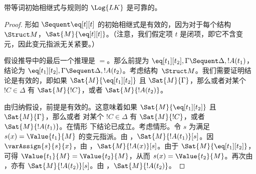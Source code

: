 \documentclass[../../../include/open-logic-section]{subfiles}
\begin{document}


\begin{prop}
带等词初始相继式与规则的 $\Log{LK}$ 是可靠的。
\end{prop}

\begin{proof}
形如 ${} \Sequent \eq[t][t]$ 的初始相继式是有效的，因为对于每个结构~$\Struct M$，$\Sat{M}{\eq[t][t]}$。（注意，我们假定项 $t$ 是闭项，即它不含变元，因此变元指派无关紧要。）

假设推导中的最后一个推理是 $=$。那么前提为 $\eq[t_1][t_2], \Gamma \Sequent \Delta, !A(t_1)$，结论为 $\eq[t_1][t_2], \Gamma \Sequent \Delta, !A(t_2)$。考虑结构~$\Struct M$。我们需要证明结论是有效的，即如果 $\Sat{M}{\eq[t_1][t_2]}$ 且 $\Sat{M}{\Gamma}$，那么或者对某个 $!C \in \Delta$ 有 $\Sat{M}{!C}$，或者 $\Sat{M}{!A(t_2)}$。

由归纳假设，前提是有效的。这意味着如果 $\Sat{M}{\eq[t_1][t_2]}$ 且 $\Sat{M}{\Gamma}$，那么或者 对某个 $!C \in \Delta$ 有 $\Sat{M}{!C}$，或者 $\Sat{M}{!A(t_1)}$。在情形 下结论已成立。考虑情形。令 $s$ 为满足 $s(x) = \Value{t_1}{M}$ 的变元指派。由 ，$\Sat{M}{!A(t_1)}[s]$。因 $\varAssign{s}{s}{x}$，由 ，$\Sat{M}{!A(x)}[s]$。由于 $\Sat{M}{\eq[t_1][t_2]}$，可得 $\Value{t_1}{M} = \Value{t_2}{M}$，从而 $s(x) = \Value{t_2}{M}$。再次由 ，亦有 $\Sat{M}{!A(t_2)}[s]$。由 ，$\Sat{M}{!A(t_2)}$。
\end{proof}
\end{document}
